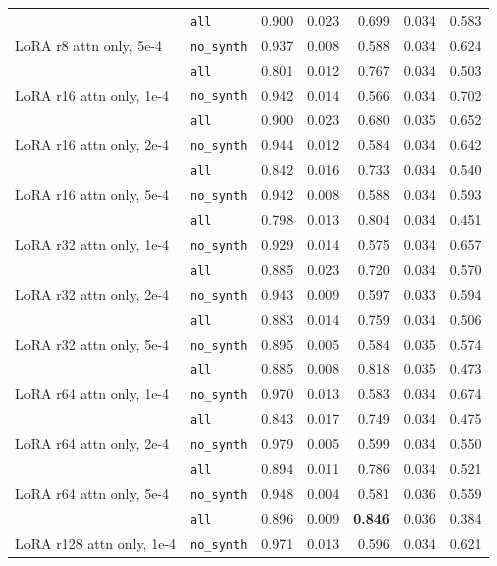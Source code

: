 \begin{longtable}{llrrrrr}
 & \texttt{all} & 0.900 & 0.023 & 0.699 & 0.034 & 0.583 \\
\addlinespace[2pt]
LoRA r8 attn only, 5e-4 & \texttt{no\_synth} & 0.937 & 0.008 & 0.588 & 0.034 & 0.624 \\
 & \texttt{all} & 0.801 & 0.012 & 0.767 & 0.034 & 0.503 \\
\addlinespace[2pt]
LoRA r16 attn only, 1e-4 & \texttt{no\_synth} & 0.942 & 0.014 & 0.566 & 0.034 & 0.702 \\
 & \texttt{all} & 0.900 & 0.023 & 0.680 & 0.035 & 0.652 \\
\addlinespace[2pt]
LoRA r16 attn only, 2e-4 & \texttt{no\_synth} & 0.944 & 0.012 & 0.584 & 0.034 & 0.642 \\
 & \texttt{all} & 0.842 & 0.016 & 0.733 & 0.034 & 0.540 \\
\addlinespace[2pt]
LoRA r16 attn only, 5e-4 & \texttt{no\_synth} & 0.942 & 0.008 & 0.588 & 0.034 & 0.593 \\
 & \texttt{all} & 0.798 & 0.013 & 0.804 & 0.034 & 0.451 \\
\addlinespace[2pt]
LoRA r32 attn only, 1e-4 & \texttt{no\_synth} & 0.929 & 0.014 & 0.575 & 0.034 & 0.657 \\
 & \texttt{all} & 0.885 & 0.023 & 0.720 & 0.034 & 0.570 \\
\addlinespace[2pt]
LoRA r32 attn only, 2e-4 & \texttt{no\_synth} & 0.943 & 0.009 & 0.597 & 0.033 & 0.594 \\
 & \texttt{all} & 0.883 & 0.014 & 0.759 & 0.034 & 0.506 \\
\addlinespace[2pt]
LoRA r32 attn only, 5e-4 & \texttt{no\_synth} & 0.895 & 0.005 & 0.584 & 0.035 & 0.574 \\
 & \texttt{all} & 0.885 & 0.008 & 0.818 & 0.035 & 0.473 \\
\addlinespace[2pt]
LoRA r64 attn only, 1e-4 & \texttt{no\_synth} & 0.970 & 0.013 & 0.583 & 0.034 & 0.674 \\
 & \texttt{all} & 0.843 & 0.017 & 0.749 & 0.034 & 0.475 \\
\addlinespace[2pt]
LoRA r64 attn only, 2e-4 & \texttt{no\_synth} & 0.979 & 0.005 & 0.599 & 0.034 & 0.550 \\
 & \texttt{all} & 0.894 & 0.011 & 0.786 & 0.034 & 0.521 \\
\addlinespace[2pt]
LoRA r64 attn only, 5e-4 & \texttt{no\_synth} & 0.948 & 0.004 & 0.581 & 0.036 & 0.559 \\
 & \texttt{all} & 0.896 & 0.009 & \textbf{0.846} & 0.036 & 0.384 \\
\addlinespace[2pt]
LoRA r128 attn only, 1e-4 & \texttt{no\_synth} & 0.971 & 0.013 & 0.596 & 0.034 & 0.621 \\

\end{longtable}
